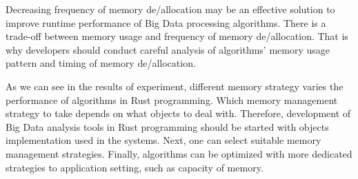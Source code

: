 Decreasing frequency of memory de/allocation may be an effective solution to improve runtime performance of Big Data processing algorithms. 
There is a trade-off between memory usage and frequency of memory de/allocation. 
That is why developers should conduct careful analysis of algorithms' memory usage pattern and timing of memory de/allocation.

As we can see in the results of experiment, different memory strategy varies the performance of algorithms in Rust programming.
Which memory management strategy to take depends on what objects to deal with. 
Therefore, development of Big Data analysis tools in Rust programming should be started with objects implementation used in the systems.
Next, one can select suitable memory management strategies. 
Finally, algorithms can be optimized with more dedicated strategies to application setting, such as capacity of memory.